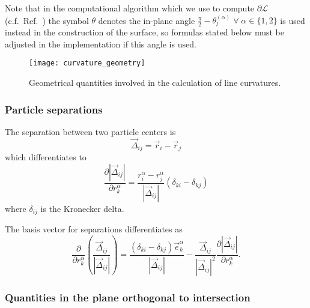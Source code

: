 Note that in the computational algorithm which we use to compute $\partial\mathcal{L}$ (c.f.\ Ref.\ \cite{Klenin2011}) the symbol $\theta$ denotes the in-plane angle $\frac{\pi}{2} - \theta_l^{(\alpha)} \; \forall \; \alpha \in \{1,2\}$ is used instead in the construction of the surface, so formulas stated below must be adjusted in the implementation if this angle is used.

\begin{SCfigure}[b]
  \centering
  \texttt{[image: curvature\_geometry]}
  \caption{Geometrical quantities involved in the calculation of line curvatures.}
  \label{fig:curvature-geometry}
\end{SCfigure}

\subsubsection{Particle separations}

The separation between two particle centers is
\begin{equation}
  \vec{\Delta}_{ij} = \vec{r}_i - \vec{r}_j
\end{equation}
which differentiates to
\begin{equation}
  \frac{\partial |\vec{\Delta}_{ij}|}{\partial r_k^\alpha} =
  \frac{r_i^\alpha - r_j^\alpha}{|\vec{\Delta}_{ij}|} (\delta_{ki} - \delta_{kj})
\end{equation}
where $\delta_{ij}$ is the Kronecker delta.

The basis vector for separations differentiates as
\begin{equation}
  \frac{\partial}{\partial r_k^\alpha}
  \left( \frac{\vec{\Delta}_{ij}}{|\vec{\Delta}_{ij}|} \right) =
  \frac{(\delta_{ki} - \delta_{kj}) \vec{e}_k^\alpha}{|\vec{\Delta}_{ij}|}
  - \frac{\vec{\Delta}_{ij}}{|\vec{\Delta}_{ij}|^2}
  \frac{\partial |\vec{\Delta}_{ij}|}{\partial r_k^\alpha}.
\end{equation}

\subsubsection{Quantities in the plane orthogonal to intersection}


